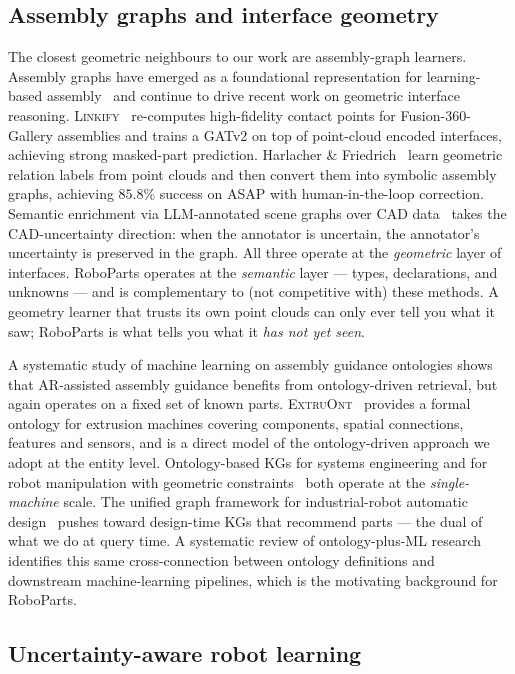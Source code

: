 \documentclass[11pt,twocolumn]{article}
\begin{document}
\subsection{Assembly graphs and interface geometry}

The closest geometric neighbours to our work are assembly-graph
learners. Assembly graphs have emerged as a foundational
representation for learning-based assembly~\cite{AssemblyKG2022} and
continue to drive recent work on geometric interface reasoning.
\textsc{Linkify}~\cite{R1} re-computes high-fidelity contact points
for Fusion-360-Gallery assemblies and trains a GATv2 on top of
point-cloud encoded interfaces, achieving strong masked-part
prediction. Harlacher \& Friedrich~\cite{R2} learn geometric relation
labels from point clouds and then convert them into symbolic assembly
graphs, achieving $85.8\%$ success on \textsc{ASAP} with human-in-the-loop
correction. Semantic enrichment via LLM-annotated scene graphs over
CAD data~\cite{R3} takes the CAD-uncertainty direction: when the
annotator is uncertain, the annotator's uncertainty is preserved in
the graph. All three operate at the \emph{geometric} layer of
interfaces. RoboParts operates at the \emph{semantic} layer — types,
declarations, and unknowns — and is complementary to (not
competitive with) these methods. A geometry learner that trusts its
own point clouds can only ever tell you what it saw; RoboParts is
what tells you what it \emph{has not yet seen}.

A systematic study of machine learning on assembly guidance ontologies
\cite{R8} shows that AR-assisted assembly guidance benefits from
ontology-driven retrieval, but again operates on a fixed set of known
parts. \textsc{ExtruOnt}~\cite{R5} provides a formal ontology for
extrusion machines covering components, spatial connections, features
and sensors, and is a direct model of the ontology-driven approach we
adopt at the entity level. Ontology-based KGs for systems engineering
\cite{R6} and for robot manipulation with geometric constraints~\cite{R7}
both operate at the \emph{single-machine} scale. The unified graph
framework for industrial-robot automatic design~\cite{R4} pushes
toward design-time KGs that recommend parts — the dual of what we do
at query time. A systematic review of ontology-plus-ML research
\cite{R9} identifies this same cross-connection between ontology
definitions and downstream machine-learning pipelines, which is the
motivating background for RoboParts.

\subsection{Uncertainty-aware robot learning}
\end{document}

